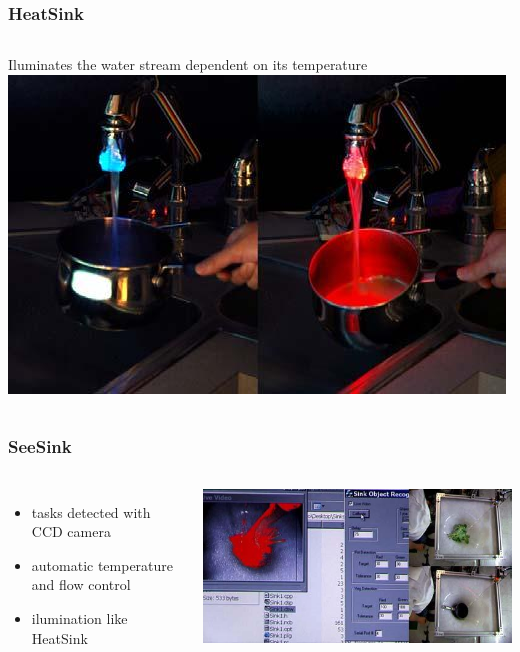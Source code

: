 \documentclass{beamer}
\begin{document}
\begin{frame}
  \frametitle{HeatSink}

  \begin{columns}[c] %
    Iluminates the water stream dependent on its temperature
    \includegraphics[width=\textwidth]{Bilder/HeatSink.jpg}
  \end{columns}
\end{frame}


\begin{frame}
  \frametitle{SeeSink}
  \begin{columns}[c]
    \begin{itemize}
    \item tasks detected with CCD camera
    \item automatic temperature and flow control
    \item ilumination like HeatSink
    \end{itemize}
    \includegraphics[width=\textwidth]{Bilder/SeeSink.jpg}
  \end{columns}

\end{frame}
\end{document}
